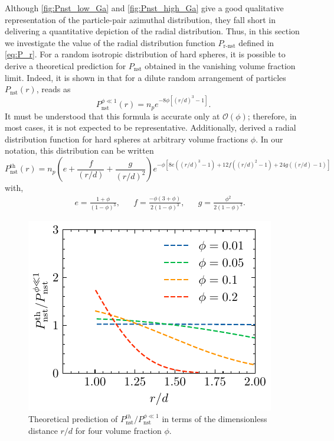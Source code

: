 Although \ref{fig:Pnst_low_Ga} and \ref{fig:Pnst_high_Ga} give a good qualitative representation of the particle-pair azimuthal distribution, they fall short in delivering a quantitative depiction of the radial distribution.
Thus, in this section we investigate the value of the radial distribution function $P_\text{r-nst}$ defined in \ref{eq:P_r}. 
For a random isotropic distribution of hard spheres, it is possible to derive a theoretical prediction for $P_\text{nst}$ obtained in the vanishing volume fraction limit. 
Indeed, it is shown in \citet{zhang2021ensemble} that for a dilute random arrangement of particles $P_\text{nst}(r)$, reads as
\begin{equation}
    P_\text{nst}^{\phi \ll 1}(r) = n_p e^{- 8\phi\left[(r/d)^3-1\right]}.
    \label{eq:Pnst_dilute}
\end{equation}
It must be understood that this formula is accurate only at $\mathcal{O}(\phi)$; therefore, in most cases, it is not expected to be representative.
Additionally, \citet{torquato1990nearest} derived a radial distribution function for hard spheres at arbitrary volume fractions $\phi$. In our notation, this distribution can be written
\begin{equation}
    P_\text{nst}^\text{th}(r) = 
        n_p\left(e+\frac{f}{(r/d)} +\frac{g}{(r/d)^2}\right)
    e^{-\phi\left[8e\left((r/d)^3-1\right)+12 f\left((r/d)^2-1\right)+24g\left((r/d)-1\right)\right]}
    \label{eq:torquato}
\end{equation}
with, 
\begin{align*}
    && e= \frac{1+\phi}{(1-\phi)^3},
    && f= \frac{-\phi (3+\phi)}{2(1-\phi)^3},
    && g= \frac{\phi^2}{2(1-\phi)^3}.
\end{align*}
\begin{figure}
    \centering
    \includegraphics[height=0.3\textwidth]{image/HOMOGENEOUS_final/Dist/Theory.pdf}
    \caption{
        Theoretical prediction of $P_\text{nst}^{th}/P_\text{nst}^{\phi \ll 1}$ in terms of the dimensionless distance $r/d$ for four volume fraction $\phi$. 
    }
    \label{fig:torquato}
\end{figure}
